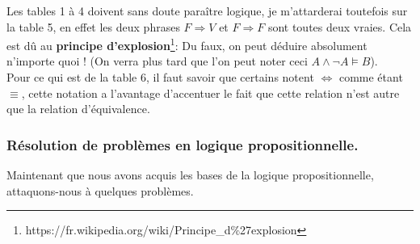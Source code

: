 \documentclass[a4paper, 12pt]{article}
\newcommand{\ffi}{\Leftrightarrow}
\newcommand{\imply}{\Rightarrow}
\numberwithin{equation}{subsection}
\begin{document}
  Les tables 1 à 4 doivent sans doute paraître logique, je m'attarderai toutefois sur la table 5, en effet les deux phrases $F \imply V$ et $F \imply F$ sont toutes deux vraies.
  Cela est dû au {\bf principe d'explosion}\footnote{https://fr.wikipedia.org/wiki/Principe\_d$\%$27explosion}: Du faux, on peut déduire absolument n'importe quoi ! (On verra plus tard que l'on peut noter ceci $A \land \neg A \models B$).\\

  Pour ce qui est de la table 6, il faut savoir que certains notent $\ffi$ comme étant $\equiv$, cette notation a l'avantage d'accentuer le fait que cette relation n'est autre que la relation d'équivalence.
  \subsubsection{Résolution de problèmes en logique propositionnelle.}
  Maintenant que nous avons acquis les bases de la logique propositionnelle,  attaquons-nous à quelques problèmes.\\
\end{document}
